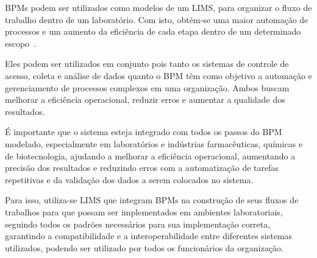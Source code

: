 BPMs podem ser utilizados como modelos de um LIMS, para organizar o fluxo de trabalho dentro de um laboratório. Com isto, obtém-se uma maior automação de processos e um aumento da eficiência de cada etapa dentro de um determinado escopo~\cite{Key2011LIMS:Systems}.

Eles podem ser utilizados em conjunto pois tanto os sistemas de controle de acesso, coleta e análise de dados quanto o BPM têm como objetivo a automação e gerenciamento de processos complexos em uma organização. Ambos buscam melhorar a eficiência operacional, reduzir erros e aumentar a qualidade dos resultados.

É importante que o sistema esteja integrado com todos os passos do BPM modelado, especialmente em laboratórios e indústrias farmacêuticas, químicas e de biotecnologia, ajudando a melhorar a eficiência operacional, aumentando a precisão dos resultados e reduzindo erros com a automatização de tarefas repetitivas e da validação dos dados a serem colocados no sistema.

Para isso, utiliza-se LIMS que integram BPMs na construção de seus fluxos de trabalhos para que possam ser implementados em ambientes laboratoriais, seguindo todos os padrões necessários para sua implementação correta, garantindo a compatibilidade e a interoperabilidade entre diferentes sistemas utilizados, podendo ser utilizado por todos os funcionários da organização.

